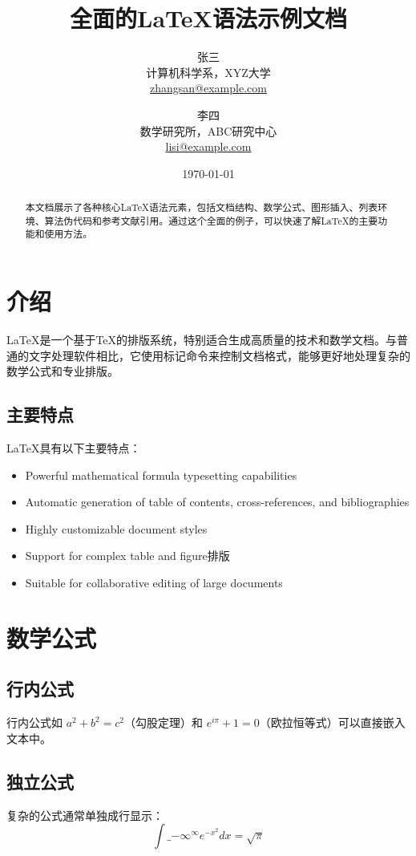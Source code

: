 \documentclass[12pt,a4paper]{ctexart}
\title{全面的LaTeX语法示例文档}
\author{
    张三 \\
    \small 计算机科学系，XYZ大学 \\
    \small \href{mailto:zhangsan@example.com}{zhangsan@example.com}
    \and
    李四 \\
    \small 数学研究所，ABC研究中心 \\
    \small \href{mailto:lisi@example.com}{lisi@example.com}
}
\date{\today}
\begin{document}
\maketitle
\begin{abstract}
本文档展示了各种核心LaTeX语法元素，包括文档结构、数学公式、图形插入、列表环境、算法伪代码和参考文献引用。通过这个全面的例子，可以快速了解LaTeX的主要功能和使用方法。
\end{abstract}

\section{介绍}
\label{sec:introduction}

LaTeX是一个基于TeX的排版系统，特别适合生成高质量的技术和数学文档\cite{lamport1994latex}。与普通的文字处理软件相比，它使用标记命令来控制文档格式，能够更好地处理复杂的数学公式和专业排版。

\subsection{主要特点}
LaTeX具有以下主要特点：
\begin{itemize}
    \item Powerful mathematical formula typesetting capabilities
    \item Automatic generation of table of contents, cross-references, and bibliographies
    \item Highly customizable document styles
    \item Support for complex table and figure排版
    \item Suitable for collaborative editing of large documents
\end{itemize}

\section{数学公式}
\label{sec:math}

\subsection{行内公式}
行内公式如 $a^2 + b^2 = c^2$（勾股定理）和 $e^{i\pi} + 1 = 0$（欧拉恒等式）可以直接嵌入文本中。

\subsection{独立公式}
复杂的公式通常单独成行显示：
\begin{equation}
    \int\_{-\infty}^{\infty} e^{-x^2} dx = \sqrt{\pi}
    \label{eq:gaussian}
\end{equation}
\end{document}
